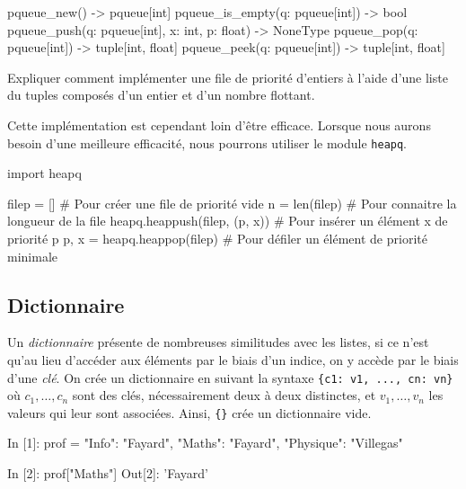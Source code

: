 \documentclass{magnolia}
\begin{document}
\begin{pythoncode}
pqueue_new() -> pqueue[int]
pqueue_is_empty(q: pqueue[int]) -> bool
pqueue_push(q: pqueue[int], x: int, p: float) -> NoneType
pqueue_pop(q: pqueue[int]) -> tuple[int, float]
pqueue_peek(q: pqueue[int]) -> tuple[int, float]
\end{pythoncode}

\begin{exoUnique}
\exo Expliquer comment implémenter une file de priorité d'entiers à l'aide d'une liste
  du tuples composés d'un entier et d'un nombre flottant.
\end{exoUnique}

\vspace{2ex}
Cette implémentation est cependant loin d'être efficace. Lorsque nous aurons besoin
d'une meilleure efficacité, nous pourrons utiliser le module \verb!heapq!.

\begin{pythoncode}
import heapq

filep = []                    # Pour créer une file de priorité vide
n = len(filep)                # Pour connaitre la longueur de la file
heapq.heappush(filep, (p, x)) # Pour insérer un élément x de priorité p
p, x = heapq.heappop(filep)   # Pour défiler un élément de priorité minimale
\end{pythoncode}

\subsection{Dictionnaire}

Un \emph{dictionnaire} présente de nombreuses similitudes avec les listes, si ce n'est qu'au lieu d'accéder aux éléments
par le biais d'un indice, on y accède par le biais d'une \emph{clé}. On crée un dictionnaire en suivant la
syntaxe \verb!{c1: v1, ..., cn: vn}! où $c_1,\ldots,c_n$ sont des clés, nécessairement deux à deux
distinctes, et $v_1,\ldots,v_n$ les valeurs qui leur sont associées. Ainsi, \verb!{}! crée un dictionnaire
vide.

\begin{pythoncode}
In [1]: prof = {"Info": "Fayard", "Maths": "Fayard", "Physique": "Villegas"}

In [2]: prof["Maths"]
Out[2]: 'Fayard'
\end{pythoncode}
\end{document}
